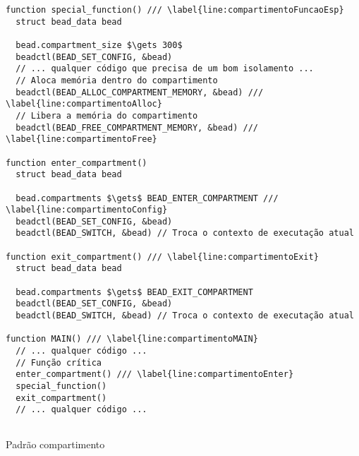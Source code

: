 \begin{pseudocode}
\begin{lstlisting}[language=pseudocode, style=pseudocode]
function special_function() /// \label{line:compartimentoFuncaoEsp}
  struct bead_data bead

  bead.compartment_size $\gets 300$
  beadctl(BEAD_SET_CONFIG, &bead)
  // ... qualquer código que precisa de um bom isolamento ...
  // Aloca memória dentro do compartimento
  beadctl(BEAD_ALLOC_COMPARTMENT_MEMORY, &bead) /// \label{line:compartimentoAlloc}
  // Libera a memória do compartimento
  beadctl(BEAD_FREE_COMPARTMENT_MEMORY, &bead) /// \label{line:compartimentoFree}

function enter_compartment()
  struct bead_data bead

  bead.compartments $\gets$ BEAD_ENTER_COMPARTMENT /// \label{line:compartimentoConfig}
  beadctl(BEAD_SET_CONFIG, &bead)
  beadctl(BEAD_SWITCH, &bead) // Troca o contexto de executação atual

function exit_compartment() /// \label{line:compartimentoExit}
  struct bead_data bead

  bead.compartments $\gets$ BEAD_EXIT_COMPARTMENT
  beadctl(BEAD_SET_CONFIG, &bead)
  beadctl(BEAD_SWITCH, &bead) // Troca o contexto de executação atual

function MAIN() /// \label{line:compartimentoMAIN}
  // ... qualquer código ...
  // Função crítica
  enter_compartment() /// \label{line:compartimentoEnter}
  special_function()
  exit_compartment()
  // ... qualquer código ...
  
\end{lstlisting}

  \caption{Padrão compartimento}
  \label{alg:compartimento}
\end{pseudocode}
